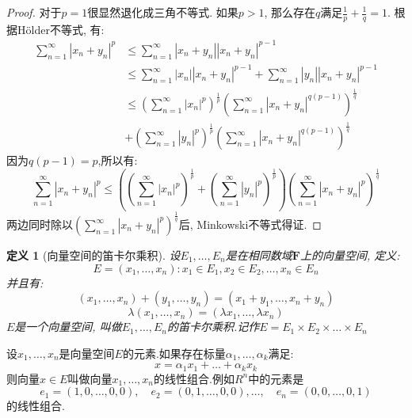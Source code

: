 \documentclass[a4paper,11pt]{book}
\newtheorem{definition}{\hspace{2em}定义}[section]
\newtheorem{proof}{证明}[section]
\begin{document}
\begin{proof}
  对于$p=1$很显然退化成三角不等式. 如果$p>1$, 那么存在$q$满足$\frac{1}{p}+\frac{1}{q}=1$. 根据H\"{o}lder不等式, 有:
  \begin{equation*}
  \begin{split}
     \sum_{n=1}^{\infty}|x_n+y_n|^p&\leq\sum_{n=1}^{\infty}|x_n+y_n||x_n+y_n|^{p-1}\\
       &\leq\sum_{n=1}^{\infty}|x_n||x_n+y_n|^{p-1}+\sum_{n=1}^{\infty}|y_n||x_n+y_n|^{p-1}\\
       &\leq(\sum_{n=1}^{\infty}|x_n|^p)^\frac{1}{p}(\sum_{n=1}^{\infty}|x_n+y_n|^{q(p-1)})^\frac{1}{q}\\
       &+(\sum_{n=1}^{\infty}|y_n|^p)^\frac{1}{p}(\sum_{n=1}^{\infty}|x_n+y_n|^{q(p-1)})^\frac{1}{q}
  \end{split}
  \end{equation*}
  因为$q(p-1)=p$,所以有:
  \begin{equation*}
    \sum_{n=1}^{\infty}|x_n+y_n|^p\leq ((\sum_{n=1}^{\infty}|x_n|^p)^\frac{1}{p}+(\sum_{n=1}^{\infty}|y_n|^p)^\frac{1}{p})(\sum_{n=1}^{\infty}|x_n+y_n|^{p})^\frac{1}{q}
  \end{equation*}
  两边同时除以$(\sum_{n=1}^{\infty}|x_n+y_n|^p)^{\frac{1}{q}}$后, Minkowski不等式得证.
\end{proof}
\begin{definition}[向量空间的笛卡尔乘积]
  设$E_1,\dots,E_n$是在相同数域$\mathbf{F}$上的向量空间, 定义:
  \begin{equation*}
    E={(x_1,\dots,x_n):x_1\in E_1,x_2\in E_2,\dots,x_n\in E_n}
  \end{equation*}
  并且有:
  \begin{equation*}
    (x_1,\dots,x_n)+(y_1,\dots,y_n)=(x_1+y_1,\dots,x_n+y_n)
  \end{equation*}
  \begin{equation*}
    \lambda(x_1,\dots,x_n)=(\lambda x_1,\dots,\lambda x_n)
  \end{equation*}
  $E$是一个向量空间, 叫做$E_1,\dots,E_n$的笛卡尔乘积.记作$E=E_1\times E_2\times\dots\times E_n$
\end{definition}
设$x_1,\dots,x_n$是向量空间$E$的元素.如果存在标量$\alpha_1,\dots,\alpha_k$满足:
\begin{equation*}
  x=\alpha_1x_1+\dots+\alpha_kx_k
\end{equation*}
则向量$x\in E$叫做向量$x_1,\dots,x_n$的线性组合.例如$R^n$中的元素是
\begin{equation*}
  e_1=(1,0,\dots,0,0),\quad e_2=(0,1,\dots,0,0),\dots,\quad e_n=(0,0,\dots,0,1)
\end{equation*}
的线性组合.
\end{document}
